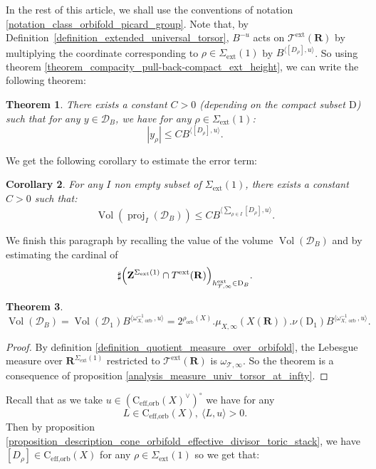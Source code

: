 \documentclass{proc-l}
\newcommand{\R}{\mathbf{R}}
\newcommand{\Z}{\mathbf{Z}}
\newcommand{\coneorb}{\text{C}_{\text{eff},\text{orb}}(X)}
\DeclareMathOperator{\proj}{proj}
\DeclareMathOperator{\Vol}{Vol}
\DeclareMathOperator{\orb}{orb}
\DeclareMathOperator{\ext}{ext}
\newcommand{\stackT}{\mathcal{T}}
\newcommand{\w}{\omega}
\newtheorem{theorem}{Theorem}[section]
\newtheorem{cor}[theorem]{Corollary}
\theoremstyle{definition}
\theoremstyle{remark}
\numberwithin{equation}{section}
\begin{document}
In the rest of this article, we shall use the conventions of notation \ref{notation_class_orbifold_picard_group}. Note that, by Definition~\ref{definition_extended_universal_torsor}, $B^{-u}$ acts on $\stackT^{\ext}(\R)$ by multiplying the coordinate corresponding to $\rho \in \Sigma_{\ext}(1)$ by $B^{\langle [D_{\rho}],u \rangle}$. So using theorem \ref{theorem_compacity_pull-back-compact_ext_height}, we can write the following theorem:


\begin{theorem}\label{theorem_crucial_majoration_estimation_number}
    There exists a constant $C > 0$ (depending on the compact subset $\mathrm{D}$) such that for any $y \in \mathcal{D}_{B}$, we have for any $\rho \in \Sigma_{\ext}(1)$: $$ |y_{\rho}| \leqslant C B^{ \langle [D_{\rho}],u \rangle } .$$
  
\end{theorem}

We get the following corollary to estimate the error term:

\begin{cor}
    For any $I$ non empty subset of $\Sigma_{\ext}(1)$, there exists a constant $C > 0$ such that:
    $$\Vol(\proj_I(\mathcal{D}_{B})) \leq C B^{ \langle \sum\limits_{\rho \in I} [D_{\rho}] , u \rangle } .$$
\end{cor}

We finish this paragraph by recalling the value of the volume $\Vol(\mathcal{D}_{B}) $ and by estimating the cardinal of $$\sharp \Bigl( \Z^{\Sigma_{\ext}(1)} \cap T^{\ext}(\R) \Bigr)_{h^{\ext}_{\stackT,\infty} \in \mathrm{D}_{B}} .$$

\begin{theorem}
    $$\Vol(\mathcal{D}_{B}) =  \Vol(\mathcal{D}_1) B^{ \langle \w_{X,\orb}^{-1} , u \rangle } = 2^{\rho_{\orb}(X)}. \mu_{X,\infty}(X(\R)). \nu(\mathrm{D}_1) B^{ \langle \w_{X,\orb}^{-1} , u \rangle } . $$
\end{theorem}

\begin{proof}
    By definition \ref{definition_quotient_measure_over_orbifold}, the Lebesgue measure over $\R^{\Sigma_{\ext}(1)}$ restricted to $\stackT^{\ext}(\R)$ is $\w_{\stackT,\infty}$. So the theorem is a consequence of proposition \ref{analysis_measure_univ_torsor_at_infty}.
\end{proof}

Recall that as we take $u \in (\coneorb^{\vee})^{\circ}$  we have for any $$L \in \coneorb, \ \langle L,u \rangle > 0 .$$Then by proposition \ref{proposition_description_cone_orbifold_effective_divisor_toric_stack}, we have $[D_{\rho}] \in \coneorb$ for any $\rho \in \Sigma_{\ext}(1)$ so we get that: 
\end{document}
